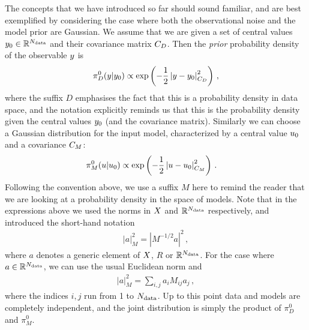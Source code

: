 The concepts that we have introduced so far should sound familiar, and are best
exemplified by considering the case where both the observational noise and the
model prior are Gaussian. We assume that we are given a set of central values
$y_0 \in \mathbb{R}^{N_{\rm data}}$ and their covariance matrix $C_{D}$. Then the {\em
prior} probability density of the observable $y$ is 
\begin{equation}
  \label{eq:PriorData}
  \pi_{D}^0(y|y_0) \propto \exp\left(
    -\frac12 \left| y - y_0 \right|_{C_{D}}^2
    \right)\, ,
\end{equation}
where the suffix $D$ emphasises the fact that this is a probability density in
data space, and the notation explicitly reminds us that this is the probability
density given the central values $y_0$ (and the covariance matrix). Similarly we
can choose a Gaussian distribution for the input model, characterized by a
central value $u_0$ and a covariance $C_M$:
\begin{align}
  \label{eq:PiZeroGauss}
  \pi_{M}^0(u|u_0)  &\propto \exp\left(
              -\frac12 \left| u - u_0 \right|_{C_M}^2
              \right)\, .
\end{align}
Following the convention above, we use a suffix $M$ here to remind the reader
that we are looking at a probability density in the space of models. Note that
in the expressions above we used the norms in $X$ and $\mathbb{R}^{N_{\rm data}}$
respectively, and introduced the short-hand notation
\begin{align}
  \left|a\right|_M^2 = \left| M^{-1/2} a\right|^2\, ,
\end{align}
where $a$ denotes a generic element of $X$, $R$ or $\mathbb{R}^{N_{\rm data}}$. For
the case where $a \in \mathbb{R}^{N_{\rm data}}$, we can use the usual Euclidean norm
and
\begin{align}
  \left| a \right|_M^2 = \sum_{i,j} a_i M_{ij} a_j\, ,
\end{align}
where the indices $i,j$ run from 1 to $N_{\rm data}$.  
Up to this point data and models are completely independent, and the joint
distribution is simply the product of $\pi_{D}^0$ and $\pi_{M}^0$. 

